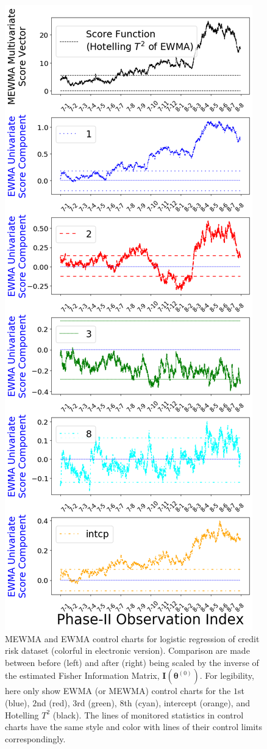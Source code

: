 \documentclass[twoside,11pt]{article}
\begin{document}
\begin{figure}[!htbp]
  \includegraphics[width = 0.48\linewidth]{../figures/v14/credit_default/logi_scal_train_PI/PII_pos_single_credit_fisher_mlines_with_regu_1e-08_0_0001_0_001_99_0.png}
  \caption{
  MEWMA and EWMA control charts for logistic regression of credit risk dataset (colorful in electronic version). Comparison are made between before (left) and after (right) being scaled by the inverse of the estimated Fisher Information Matrix, $\mathbf {I} ( {\bm{\theta}} ^{(0)})$. For legibility, here only show EWMA (or MEWMA) control charts for the $1$st (blue), $2$nd (red), $3$rd (green), $8$th (cyan), intercept (orange), and Hotelling $T^2$ (black). The lines of monitored statistics in control charts have the same style and color with lines of their control limits correspondingly.
}
\label{fig:credit_default_diag}
\end{figure}
\end{document}
